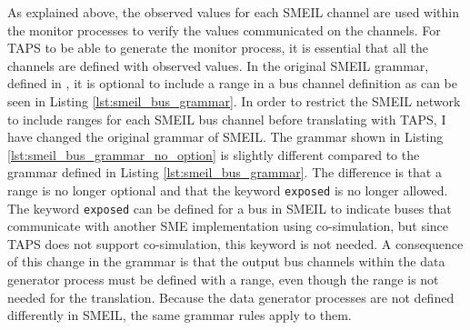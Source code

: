 As explained above, the observed values for each SMEIL channel are used within the monitor processes to verify the values communicated on the channels. For TAPS to be able to generate the monitor process, it is essential that all the channels are defined with observed values. In the original SMEIL grammar, defined in \cite{Asheim2018}, it is optional to include a range in a bus channel definition as can be seen in Listing \ref{lst:smeil_bus_grammar}.
In order to restrict the SMEIL network to include ranges for each SMEIL bus channel before translating with TAPS, I have changed the original grammar of SMEIL. The grammar shown in Listing \ref{lst:smeil_bus_grammar_no_option} is slightly different compared to the grammar defined in Listing \ref{lst:smeil_bus_grammar}. The difference is that a range is no longer optional and that the keyword \texttt{exposed} is no longer allowed. The keyword \texttt{exposed} can be defined for a bus in SMEIL to indicate buses that communicate with another SME implementation using co-simulation, but since TAPS does not support co-simulation, this keyword is not needed. A consequence of this change in the grammar is that the output bus channels within the data generator process must be defined with a range, even though the range is not needed for the translation. Because the data generator processes are not defined differently in SMEIL, the same grammar rules apply to them.\\

